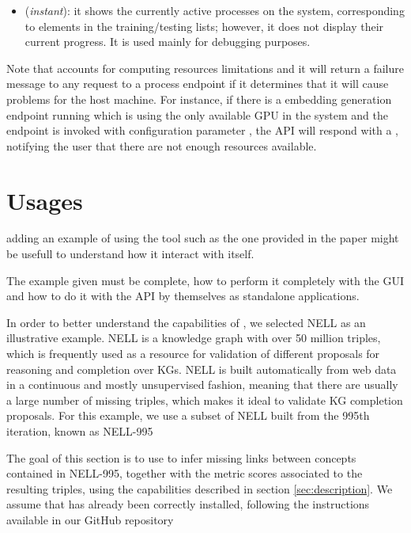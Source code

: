 \begin{itemize}
    \item {} (\emph{instant}): it shows the currently active processes on the system, corresponding to elements in the training/testing lists; however, it does not display their current progress. It is used mainly for debugging purposes.
\end{itemize}

Note that \toolname{} accounts for computing resources limitations and it will return a failure message to any request to a process endpoint if it determines that it will cause problems for the host machine. For instance, if there is a embedding generation endpoint running which is using the only available GPU in the system and the  endpoint is invoked with configuration parameter , the API will respond with a , notifying the user that there are not enough resources available.


\section{Usages}\label{sec:theo-subgraph}
adding an example of using the tool such as the one provided in the paper might be usefull to understand how it interact with itself.

The example given must be complete, how to perform it completely with the GUI and how to do it with the API by themselves as standalone applications.


In order to better understand the capabilities of \toolname{},  we selected NELL
as an illustrative example. NELL is a knowledge graph with over 50 million triples, which is frequently used as a resource for validation of different proposals for reasoning and completion over KGs.  NELL is built automatically from web data in a continuous and mostly unsupervised fashion, meaning that there are usually a large number of missing triples, which makes it ideal to validate KG completion proposals. For this example, we use a subset of NELL built from the 995th iteration, known as NELL-995

The goal of this section is to use \toolname{} to infer missing links between concepts contained in NELL-995, together with the metric scores associated to the resulting triples, using the capabilities described in section \ref{sec:description}.  We assume that \toolname{} has already been correctly installed, following the instructions available in our GitHub repository 


